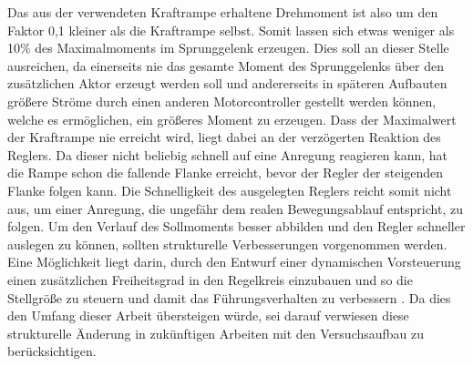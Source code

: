 Das aus der verwendeten Kraftrampe erhaltene Drehmoment ist also um den Faktor 0,1 kleiner als die Kraftrampe selbst. Somit lassen sich etwas weniger als 10\% des Maximalmoments im Sprunggelenk erzeugen. Dies soll an dieser Stelle ausreichen, da einerseits nie das gesamte Moment des Sprunggelenks über den zusätzlichen Aktor erzeugt werden soll und andererseits in späteren Aufbauten größere Ströme durch einen anderen Motorcontroller gestellt werden können, welche es ermöglichen, ein größeres Moment zu erzeugen. Dass der Maximalwert der Kraftrampe nie erreicht wird, liegt dabei an der verzögerten Reaktion des Reglers. Da dieser nicht beliebig schnell auf eine Anregung reagieren kann, hat die Rampe schon die fallende Flanke erreicht, bevor der Regler der steigenden Flanke folgen kann. Die Schnelligkeit des ausgelegten Reglers reicht somit nicht aus, um einer Anregung, die ungefähr dem realen Bewegungsablauf entspricht, zu folgen. Um den Verlauf des Sollmoments besser abbilden und den Regler schneller auslegen zu können, sollten strukturelle Verbesserungen vorgenommen werden. Eine Möglichkeit liegt darin, durch den Entwurf einer dynamischen Vorsteuerung einen zusätzlichen Freiheitsgrad in den Regelkreis einzubauen und so die Stellgröße zu steuern und damit das Führungsverhalten zu verbessern \cite{Follinger.2016}. Da dies den Umfang dieser Arbeit übersteigen würde, sei darauf verwiesen diese strukturelle Änderung in zukünftigen Arbeiten mit den Versuchsaufbau zu berücksichtigen.

